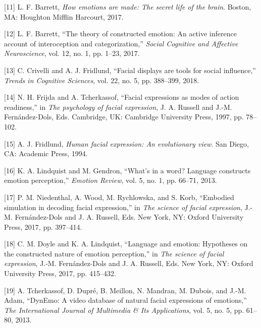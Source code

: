 \documentclass[conference,final,]{IEEEtran}
\begin{document}
\leavevmode\hypertarget{ref-barrett2017emotions}{}%
{[}11{]} L. F. Barrett, \emph{How emotions are made: The secret life of
the brain}. Boston, MA: Houghton Mifflin Harcourt, 2017.

\leavevmode\hypertarget{ref-barrett2017theory}{}%
{[}12{]} L. F. Barrett, ``The theory of constructed emotion: An active
inference account of interoception and categorization,'' \emph{Social
Cognitive and Affective Neuroscience}, vol. 12, no. 1, pp. 1--23, 2017.

\leavevmode\hypertarget{ref-crivelli2018facial}{}%
{[}13{]} C. Crivelli and A. J. Fridlund, ``Facial displays are tools for
social influence,'' \emph{Trends in Cognitive Sciences}, vol. 22, no. 5,
pp. 388--399, 2018.

\leavevmode\hypertarget{ref-frijda1997facial}{}%
{[}14{]} N. H. Frijda and A. Tcherkassof, ``Facial expressions as modes
of action readiness,'' in \emph{The psychology of facial expression}, J.
A. Russell and J.-M. Fernández-Dols, Eds. Cambridge, UK: Cambridge
University Press, 1997, pp. 78--102.

\leavevmode\hypertarget{ref-fridlund1994human}{}%
{[}15{]} A. J. Fridlund, \emph{Human facial expression: An evolutionary
view}. San Diego, CA: Academic Press, 1994.

\leavevmode\hypertarget{ref-lindquist2013s}{}%
{[}16{]} K. A. Lindquist and M. Gendron, ``What's in a word? Language
constructs emotion perception,'' \emph{Emotion Review}, vol. 5, no. 1,
pp. 66--71, 2013.

\leavevmode\hypertarget{ref-niedenthal2017embodied}{}%
{[}17{]} P. M. Niedenthal, A. Wood, M. Rychlowska, and S. Korb,
``Embodied simulation in decoding facial expression,'' in \emph{The
science of facial expression}, J.-M. Fernández-Dols and J. A. Russell,
Eds. New York, NY: Oxford University Press, 2017, pp. 397--414.

\leavevmode\hypertarget{ref-doyle2017language}{}%
{[}18{]} C. M. Doyle and K. A. Lindquist, ``Language and emotion:
Hypotheses on the constructed nature of emotion perception,'' in
\emph{The science of facial expression}, J.-M. Fernández-Dols and J. A.
Russell, Eds. New York, NY: Oxford University Press, 2017, pp. 415--432.

\leavevmode\hypertarget{ref-tcherkassof2013dynemo}{}%
{[}19{]} A. Tcherkassof, D. Dupré, B. Meillon, N. Mandran, M. Dubois,
and J.-M. Adam, ``DynEmo: A video database of natural facial expressions
of emotions,'' \emph{The International Journal of Multimedia \& Its
Applications}, vol. 5, no. 5, pp. 61--80, 2013.
\end{document}
